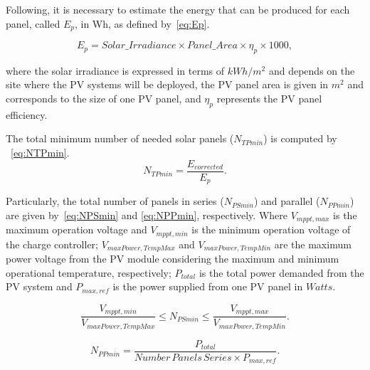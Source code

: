 \documentclass[10pt,conference]{IEEEtran}
\begin{document}
Following, it is necessary to estimate the energy that can be produced for each panel, called $E_{p}$, in Wh, as defined by~\eqref{eq:Ep}.

\begin{equation}
\label{eq:Ep}
\scriptstyle E_{p} = \scriptstyle Solar\_Irradiance \times Panel\_Area \times \eta_{p} \times 1000,
\end{equation}

\noindent where the solar irradiance is expressed in terms of $kWh/m^{2}$ and depends on the site where the PV systems will be deployed, the PV panel area is given in $m^{2}$ and corresponds to the size of one PV panel, and $\eta_{p}$ represents the PV panel efficiency.

The total minimum number of needed solar panels ($N_{TPmin}$) is computed by ~\eqref{eq:NTPmin}.
\begin{equation}
\label{eq:NTPmin}
\scriptstyle N_{TPmin} = \dfrac{\scriptstyle E_{corrected}}{\scriptstyle E_{p}}.
\end{equation}

Particularly, the total number of panels in series ($N_{PSmin}$) and parallel ($N_{PPmin}$) are given by~\eqref{eq:NPSmin} and \eqref{eq:NPPmin}, respectively.  Where $V_{mppt,max}$ is the maximum operation voltage and $V_{mppt,min}$ is the minimum operation voltage of the charge controller; $V_{maxPower,TempMax}$ and $V_{maxPower,TempMin}$ are the maximum power voltage from the PV module considering the maximum and minimum operational temperature, respectively; $P_{total}$ is the total power demanded from the PV system and $P_{max,ref}$ is the power supplied from one PV panel in $Watts$.

\begin{equation}
\label{eq:NPSmin}
\dfrac{\scriptstyle V_{mppt,min}}{\scriptstyle V_{maxPower,TempMax}} \scriptstyle \leq \scriptstyle N_{PSmin} \leq \dfrac{\scriptstyle V_{mppt,max}}{\scriptstyle V_{maxPower,TempMin}}.
\end{equation}

\begin{equation}
\label{eq:NPPmin}
\scriptstyle N_{PPmin} = \dfrac{\scriptstyle P_{total}}{\scriptstyle Number\,Panels\,Series \scriptstyle \times \scriptstyle P_{max,ref}}.
\end{equation}
\end{document}
